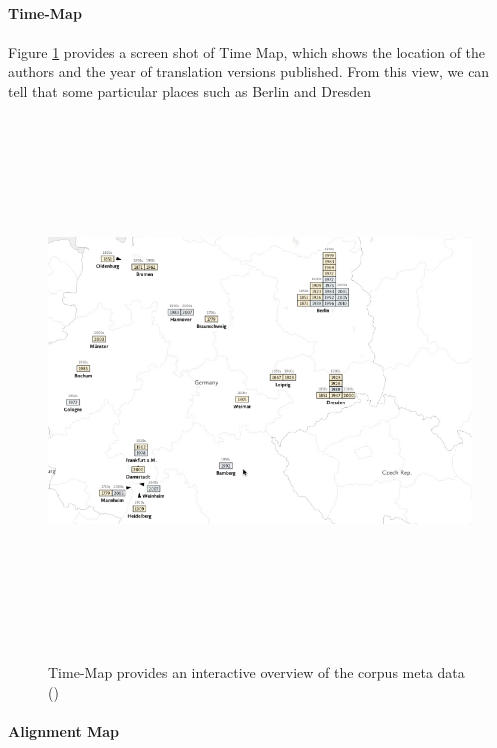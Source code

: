 \paragraph{Time-Map}
\paragraph[]{}

Figure \ref{fig:timeMap} provides a screen shot of Time Map, which shows the location of the authors and the year of translation versions published. From this view, we can tell that some particular places such as Berlin and Dresden

\begin{figure}[H] 
	\centering	
	\includegraphics[width=16cm, height=14cm]{Figs/Time-Map}\\[1ex]
	\caption{Time-Map provides an interactive overview of the corpus meta data (\cite{Cheesman2012})}
	\label{fig:timeMap}
\end{figure} 

\paragraph{Alignment Map}
\paragraph[]{}

